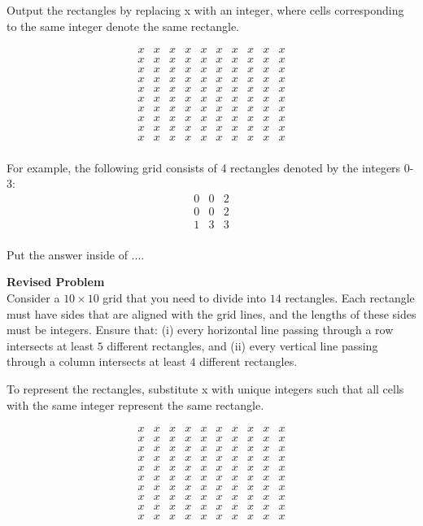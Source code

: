 Output the rectangles by replacing x with an integer, where cells corresponding to the same integer denote the same rectangle.

$$\begin{array}{cccccccccc}
x & x & x & x & x & x & x & x & x & x \\
x & x & x & x & x & x & x & x & x & x \\
x & x & x & x & x & x & x & x & x & x \\
x & x & x & x & x & x & x & x & x & x \\
x & x & x & x & x & x & x & x & x & x \\
x & x & x & x & x & x & x & x & x & x \\
x & x & x & x & x & x & x & x & x & x \\
x & x & x & x & x & x & x & x & x & x \\
x & x & x & x & x & x & x & x & x & x \\
x & x & x & x & x & x & x & x & x & x \\
\end{array}$$

For example, the following grid consists of 4 rectangles denoted by the integers 0-3:
$$
\begin{array}{ccc}
0 & 0 & 2 \\
0 & 0 & 2 \\
1 & 3 & 3 \\
\end{array}
$$

Put the answer inside of $\boxed{...}$.


\textbf{Revised Problem}\\
Consider a $10 \times 10$ grid that you need to divide into $14$ rectangles. Each rectangle must have sides that are aligned with the grid lines, and the lengths of these sides must be integers. Ensure that: (i) every horizontal line passing through a row intersects at least $5$ different rectangles, and (ii) every vertical line passing through a column intersects at least $4$ different rectangles.

To represent the rectangles, substitute x with unique integers such that all cells with the same integer represent the same rectangle.

$$\begin{array}{cccccccccc}
x & x & x & x & x & x & x & x & x & x \\
x & x & x & x & x & x & x & x & x & x \\
x & x & x & x & x & x & x & x & x & x \\
x & x & x & x & x & x & x & x & x & x \\
x & x & x & x & x & x & x & x & x & x \\
x & x & x & x & x & x & x & x & x & x \\
x & x & x & x & x & x & x & x & x & x \\
x & x & x & x & x & x & x & x & x & x \\
x & x & x & x & x & x & x & x & x & x \\
x & x & x & x & x & x & x & x & x & x \\
\end{array}$$

